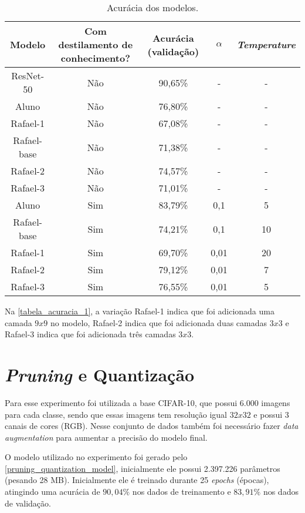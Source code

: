 \begin{center}
\begin{table}[htb]
\centering
\ABNTEXfontereduzida
\caption[Acurácia dos modelos]{Acurácia dos modelos.}
\label{tabela_acuracia_1}
\begin{tabular}{ |c|c|c|c|c| }
	\hline
	\textbf{Modelo} & \textbf{Com destilamento de conhecimento?}  & \textbf{Acurácia (validação)}
		   & \textbf{$\alpha$} & \textbf{\textit{Temperature}} \\
	\hline
	ResNet-50 	& 	Não 	& 	90,65\%	& 	- 	& 	-	 \\
	Aluno 		& 	Não 	& 	76,80\%	& 	- 	& 	-	 \\
	Rafael-1 	& 	Não 	& 	67,08\%	& 	- 	& 	-	 \\
	Rafael-base 	& 	Não 	& 	71,38\%	& 	- 	& 	-	 \\
	Rafael-2 	& 	Não 	& 	74,57\%	& 	- 	& 	-	 \\
	Rafael-3 	& 	Não 	& 	71,01\%	& 	- 	& 	-	 \\
	Aluno 		& 	Sim 	& 	83,79\%	& 	0,1 	& 	5	 \\
	Rafael-base 	& 	Sim 	& 	74,21\%	& 	0,1 	& 	10	 \\
	Rafael-1 	& 	Sim 	& 	69,70\%	& 	0,01 	& 	20	 \\
	Rafael-2 	& 	Sim 	& 	79,12\%	& 	0,01 	& 	7	 \\
	Rafael-3 	& 	Sim 	& 	76,55\%	& 	0,01 	& 	5	 \\
	\hline
\end{tabular}
\end{table}
\end{center}

Na \autoref{tabela_acuracia_1}, a variação Rafael-1 indica que foi adicionada uma camada $9x9$ no modelo, Rafael-2
indica que foi adicionada duas camadas $3x3$ e Rafael-3 indica que foi adicionada três camadas $3x3$.

\section{\textit{Pruning} e Quantização}

Para esse experimento foi utilizada a base CIFAR-10, que possui 6.000 imagens para cada classe, sendo que essas imagens
tem resolução igual $32x32$ e possui 3 canais de cores (RGB). Nesse conjunto de dados também foi necessário fazer
\textit{data augmentation} para aumentar a precisão do modelo final.

O modelo utilizado no experimento foi gerado pelo \autoref{pruning_quantization_model}, inicialmente ele possui
2.397.226 parâmetros (pesando 28 MB). Inicialmente ele é treinado durante 25 \textit{epochs} (épocas), atingindo
uma acurácia de $90,04\%$ nos dados de treinamento e $83,91\%$ nos dados de validação.

